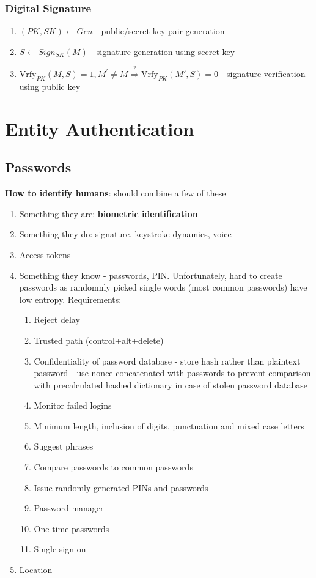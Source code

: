 \documentclass{article}
\begin{document}
\subsubsection{Digital Signature}
\begin{enumerate}
	\item $(PK, SK) \leftarrow Gen$ - public/secret key-pair generation
	\item $S \leftarrow Sign_{SK}(M)$ - signature generation using secret key
	\item $\text{Vrfy}_{PK}(M, S) = 1, M^{\prime} \neq M \stackrel{?}{\Rightarrow} \text{Vrfy}_{PK}(M', S) = 0$ - signature verification using public key
\end{enumerate}

\section{Entity Authentication}
\subsection{Passwords}
\textbf{How to identify humans}: should combine a few of these
\begin{enumerate}
	\item Something they are: \textbf{biometric identification}
	\item Something they do: signature, keystroke dynamics, voice
	\item Access tokens
	\item Something they know - passwords, PIN. Unfortunately, hard to create passwords as randomnly picked single words (most common passwords) have low entropy. Requirements:
	\begin{enumerate}
		\item Reject delay
		\item Trusted path (control+alt+delete)
		\item Confidentiality of password database - store hash rather than plaintext password - use nonce concatenated with passwords to prevent comparison with precalculated hashed dictionary in case of stolen password database
		
		\item Monitor failed logins
		\item Minimum length, inclusion of digits, punctuation and mixed case letters
		\item Suggest phrases
		\item Compare passwords to common passwords
		\item Issue randomly generated PINs and passwords
		\item Password manager
		\item One time passwords
		\item Single sign-on
	\end{enumerate}
	\item Location
\end{enumerate}
\end{document}
